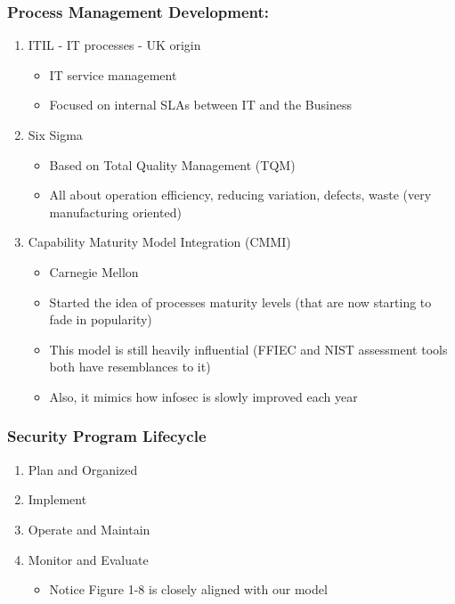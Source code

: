 \documentclass[11pt]{article}
\begin{document}
\subsubsection{Process Management Development:}
\label{sec:org3da8dc0}
\begin{enumerate}
\item ITIL - IT processes - UK origin
\label{sec:org368ba11}
\begin{itemize}
\item IT service management
\item Focused on internal SLAs between IT and the Business
\end{itemize}
\item Six Sigma
\label{sec:org299bf4b}
\begin{itemize}
\item Based on Total Quality Management (TQM)
\item All about operation efficiency, reducing variation, defects, waste (very manufacturing oriented)
\end{itemize}
\item Capability Maturity Model Integration (CMMI)
\label{sec:org8ddf8a1}
\begin{itemize}
\item Carnegie Mellon
\item Started the idea of processes maturity levels (that are now starting to fade in popularity)
\item This model is still heavily influential (FFIEC and NIST assessment tools both have resemblances to it)
\item Also, it mimics how infosec is slowly improved each year
\end{itemize}
\end{enumerate}
\subsubsection{Security Program Lifecycle}
\label{sec:org5b6fab8}
\begin{enumerate}
\item Plan and Organized
\label{sec:org4a9af5d}
\item Implement
\label{sec:org012fda7}
\item Operate and Maintain
\label{sec:orgab01677}
\item Monitor and Evaluate
\label{sec:org03bfeee}
\begin{itemize}
\item Notice Figure 1-8 is closely aligned with our model
\end{itemize}
\end{enumerate}
\end{document}
